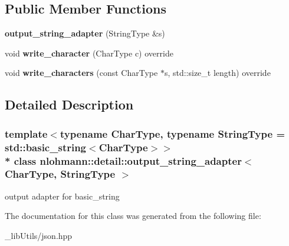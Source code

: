 \subsection*{Public Member Functions}
\begin{DoxyCompactItemize}
\item 
{\bfseries output\+\_\+string\+\_\+adapter} (String\+Type \&s)\hypertarget{classnlohmann_1_1detail_1_1output__string__adapter_a1e21ccc96316cb7fc1adcc58f509d581}{}\label{classnlohmann_1_1detail_1_1output__string__adapter_a1e21ccc96316cb7fc1adcc58f509d581}

\item 
void {\bfseries write\+\_\+character} (Char\+Type c) override\hypertarget{classnlohmann_1_1detail_1_1output__string__adapter_a2d76cc6c88ddbc196a63fcfcac9ee7d1}{}\label{classnlohmann_1_1detail_1_1output__string__adapter_a2d76cc6c88ddbc196a63fcfcac9ee7d1}

\item 
void {\bfseries write\+\_\+characters} (const Char\+Type $\ast$s, std\+::size\+\_\+t length) override\hypertarget{classnlohmann_1_1detail_1_1output__string__adapter_ab5ea4da075305d225dfd84ad997e8747}{}\label{classnlohmann_1_1detail_1_1output__string__adapter_ab5ea4da075305d225dfd84ad997e8747}

\end{DoxyCompactItemize}


\subsection{Detailed Description}
\subsubsection*{template$<$typename Char\+Type, typename String\+Type = std\+::basic\+\_\+string$<$\+Char\+Type$>$$>$\\*
class nlohmann\+::detail\+::output\+\_\+string\+\_\+adapter$<$ Char\+Type, String\+Type $>$}

output adapter for basic\+\_\+string 

The documentation for this class was generated from the following file\+:\begin{DoxyCompactItemize}
\item 
\+\_\+lib\+Utils/json.\+hpp\end{DoxyCompactItemize}
